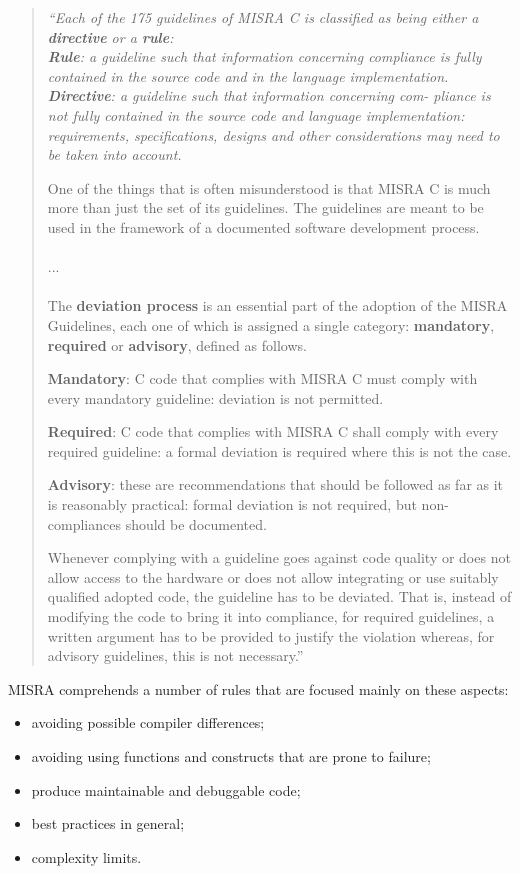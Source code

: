 \begin{quote}
\itshape
``Each of the 175 guidelines of MISRA C is classified as being either a \textbf{directive} or a \textbf{rule}:
\\
\textbf{Rule}: a guideline such that information concerning compliance is fully contained in the source code and in the language implementation.
\\
\textbf{Directive}: a guideline such that information concerning com- pliance is not fully contained in the source code and language implementation: requirements, specifications, designs and other considerations may need to be taken into account.

One of the things that is often misunderstood is that MISRA C is much more than just the set of its guidelines. The guidelines are meant to be used in the framework of a documented software development process.
\\\\
...
\\\\
The \textbf{deviation process} is an essential part of the adoption of the MISRA Guidelines, each one of which is assigned a single category: \textbf{mandatory}, \textbf{required} or \textbf{advisory}, defined as follows.

\textbf{Mandatory}: C code that complies with MISRA C must comply with every mandatory guideline: deviation is not permitted.

\textbf{Required}: C code that complies with MISRA C shall comply with every required guideline: a formal deviation is required where this is not the case.

\textbf{Advisory}: these are recommendations that should be followed as far as it is reasonably practical: formal deviation is not required, but non-compliances should be documented.

Whenever complying with a guideline goes against code quality or does not allow access to the hardware or does not allow integrating or use suitably qualified adopted code, the guideline has to be deviated. That is, instead of modifying the code to bring it into compliance, for required guidelines, a written argument has to be provided to justify the violation whereas, for advisory guidelines, this is not necessary.''
\end{quote}
MISRA comprehends a number of rules that are focused mainly on these aspects:
\begin{itemize}
  \item avoiding possible compiler differences;
  \item avoiding using functions and constructs that are prone to failure;
  \item produce maintainable and debuggable code;
  \item best practices in general;
  \item complexity limits.
\end{itemize}
